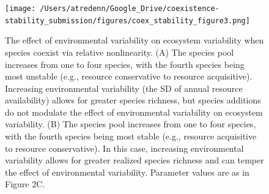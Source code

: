 \documentclass[12pt,]{article}
\begin{document}
\newpage{}

\begin{figure}[!ht]
  \centering
      \texttt{[image: /Users/atredenn/Google\_Drive/coexistence-stability\_submission/figures/coex\_stability\_figure3.png]}
  \caption{The effect of environmental variability on ecosystem variability when species coexist via relative nonlinearity. (A) The species pool increases from one to four species, with the fourth species being most unstable (e.g., resource conservative to resource acquisitive). Increasing environmental variability (the SD of annual resource availability) allows for greater species richness, but species additions do not modulate the effect of environmental variability on ecosystem variability. (B) The species pool increases from one to four species, with the fourth species being most stable (e.g., resource acquisitive to resource conservative). In this case, increasing environmental variability allows for greater realized species richness and can temper the effect of environmental variability. Parameter values are as in Figure 2C.}
\end{figure}

\newpage{}
\end{document}
